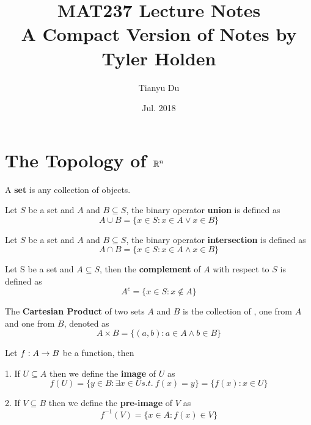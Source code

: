 \documentclass{article}
\author{Tianyu Du}
\title{MAT237 Lecture Notes \\ \small A Compact Version of Notes by Tyler Holden}
\date{Jul. 2018}
\begin{document}
	\maketitle
	\tableofcontents
	
	\section{The Topology of $\mathbb{R} ^n$}
	
	\begin{definition}
		A \textbf{set} is any collection of  objects.
	\end{definition}
	
	\begin{definition}
		Let $S$ be a set and $A$ and $B \subseteq S$, the binary operator \textbf{union} is defined as
		\[
			A \cup B = \{x \in S: x \in A \lor x \in B \}
		\]
	\end{definition}
	
	\begin{definition}
		Let $S$ be a set and $A$ and $B \subseteq S$, the binary operator \textbf{intersection} is defined as
		\[
			A \cap B = \{x \in S: x \in A \land x \in B \}
		\]
	\end{definition}
	
	\begin{definition}
		Let S be a set and $A \subseteq S$, then the \textbf{complement} of $A$ with respect to $S$ is defined as
		\[
			A^c = \{x \in S: x \notin A\}
		\] 
	\end{definition}
	
	\begin{definition}
		The \textbf{Cartesian Product} of two sets $A$ and $B$ is the collection of , one from $A$ and one from $B$, denoted as 
		\[
			A \times B = \{(a, b): a \in A \land b \in B \}
		\]	
	\end{definition}
	
	\begin{definition}
		Let ${f}: {A} \to {B}$ be a function, then
		
		1. If $U \subseteq A$ then we define the \textbf{image} of $U$ as
			\[
				f(U) = \{y \in B: \exists x \in U s.t.\ f(x) = y \} = \{f(x): x\in U\}
			\] 
		
		2. If $V \subseteq B$ then we define the \textbf{pre-image} of $V$ as 
			\[
				f^{-1}(V) = \{x \in A: f(x) \in V\}
			\]
	\end{definition}
	
	
	
	
	
	
	
	
	
	
	
	
	
	
	
	
\end{document}
